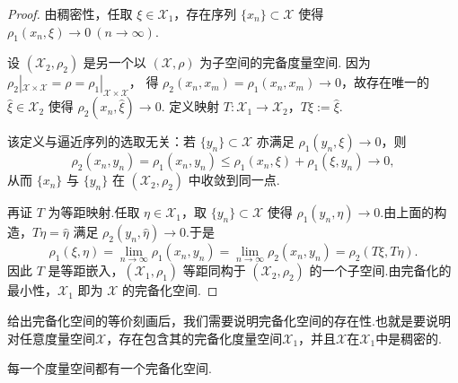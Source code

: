 \documentclass[../master.tex]{subfiles}
\begin{document}
\begin{proof}
由稠密性，任取 $\xi\in\mathcal X_1$，存在序列 $\{x_n\}\subset\mathcal X$ 使得
$\rho_1(x_n,\xi)\to 0\ (n\to\infty)$.

设 $(\mathcal X_2,\rho_2)$ 是另一个以 $(\mathcal X,\rho)$ 为子空间的完备度量空间.
因为 $\rho_2|_{\mathcal X\times\mathcal X}=\rho=\rho_1|_{\mathcal X\times\mathcal X}$，
得 $\rho_2(x_n,x_m)=\rho_1(x_n,x_m)\to 0$，故存在唯一的
$\hat\xi\in\mathcal X_2$ 使得 $\rho_2(x_n,\hat\xi)\to 0$.
定义映射 $T:\mathcal X_1\to\mathcal X_2$，$T\xi:=\hat\xi$.

该定义与逼近序列的选取无关：若 $\{y_n\}\subset\mathcal X$ 亦满足
$\rho_1(y_n,\xi)\to 0$，则
\[
\rho_2(x_n,y_n)=\rho_1(x_n,y_n)
\le \rho_1(x_n,\xi)+\rho_1(\xi,y_n)\to 0,
\]
从而 $\{x_n\}$ 与 $\{y_n\}$ 在 $(\mathcal X_2,\rho_2)$ 中收敛到同一点.

再证 $T$ 为等距映射.任取 $\eta\in\mathcal X_1$，取 $\{y_n\}\subset\mathcal X$
使得 $\rho_1(y_n,\eta)\to 0$.由上面的构造，$T\eta=\hat\eta$ 满足
$\rho_2(y_n,\hat\eta)\to 0$.于是
\[
\rho_1(\xi,\eta)
=\lim_{n\to\infty}\rho_1(x_n,y_n)
=\lim_{n\to\infty}\rho_2(x_n,y_n)
=\rho_2(T\xi,T\eta).
\]
因此 $T$ 是等距嵌入，$(\mathcal X_1,\rho_1)$ 等距同构于
$(\mathcal X_2,\rho_2)$ 的一个子空间.由完备化的最小性，$\mathcal X_1$
即为 $\mathcal X$ 的完备化空间.
\end{proof}


给出完备化空间的等价刻画后，我们需要说明完备化空间的存在性.也就是要说明对任意度量空间$\mathcal{X}$，存在包含其的完备化度量空间$\mathcal{X}_1$，并且$\mathcal{X}$在$\mathcal{X}_1$中是稠密的.


\begin{theorem}[完备化存在性]\label{thm:completion}
每一个度量空间都有一个完备化空间.
\end{theorem}
\end{document}
